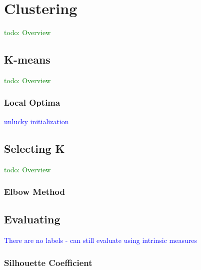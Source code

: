 \section{Clustering}

\textcolor{green}{todo: Overview}

\subsection{K-means}

\textcolor{green}{todo: Overview}

\subsubsection{Local Optima}

\textcolor{blue}{unlucky initialization}

\subsection{Selecting K}

\textcolor{green}{todo: Overview}

\subsubsection{Elbow Method}

\subsection{Evaluating}

\textcolor{blue}{There are no labels - can still evaluate using intrinsic measures}

\subsubsection{Silhouette Coefficient}